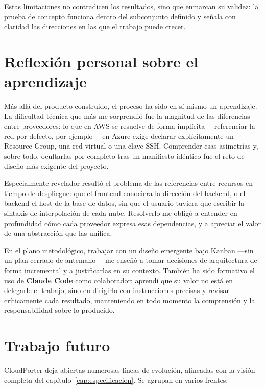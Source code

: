 Estas limitaciones no contradicen los resultados, sino que enmarcan su validez: la prueba de concepto
funciona dentro del subconjunto definido y señala con claridad las direcciones en las que el trabajo
puede crecer.

\section{Reflexión personal sobre el aprendizaje}

Más allá del producto construido, el proceso ha sido en sí mismo un aprendizaje. La dificultad técnica
que más me sorprendió fue la magnitud de las diferencias entre proveedores: lo que en AWS se resuelve de
forma implícita —referenciar la red por defecto, por ejemplo— en Azure exige declarar explícitamente un
Resource Group, una red virtual o una clave SSH. Comprender esas asimetrías y, sobre todo, ocultarlas por
completo tras un manifiesto idéntico fue el reto de diseño más exigente del proyecto.

Especialmente revelador resultó el problema de las referencias entre recursos en tiempo de despliegue:
que el frontend conociera la dirección del backend, o el backend el host de la base de datos, sin que el
usuario tuviera que escribir la sintaxis de interpolación de cada nube. Resolverlo me obligó a entender
en profundidad cómo cada proveedor expresa esas dependencias, y a apreciar el valor de una abstracción
que las unifica.

En el plano metodológico, trabajar con un diseño emergente bajo Kanban —sin un plan cerrado de
antemano— me enseñó a tomar decisiones de arquitectura de forma incremental y a justificarlas en su
contexto. También ha sido formativo el uso de \textbf{Claude Code} como colaborador: aprendí que su
valor no está en delegarle el trabajo, sino en dirigirlo con instrucciones precisas y revisar
críticamente cada resultado, manteniendo en todo momento la comprensión y la responsabilidad sobre lo
producido.

\section{Trabajo futuro}

CloudPorter deja abiertas numerosas líneas de evolución, alineadas con la visión completa del
capítulo~\ref{cap:especificacion}. Se agrupan en varios frentes:

